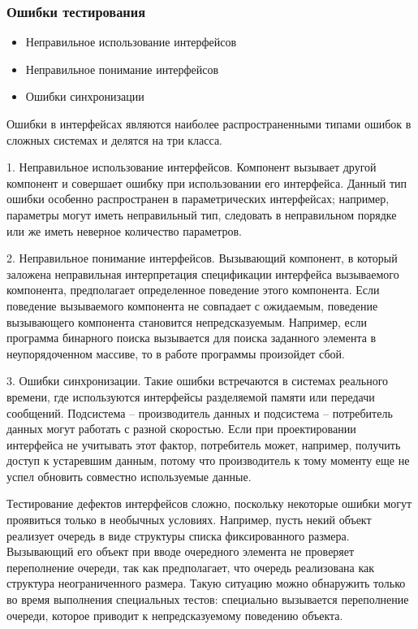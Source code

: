 \documentclass{../industrial-development}
\begin{document}
\begin{frame} \frametitle{Ошибки тестирования}
\begin{itemize}
\item Неправильное использование интерфейсов
\item Неправильное понимание интерфейсов
\item Ошибки синхронизации
\end{itemize}
\end{frame}

\lecturenotes

Ошибки в интерфейсах являются наиболее распространенными типами ошибок в сложных системах и делятся на три класса.

1. Неправильное использование интерфейсов. Компонент вызывает другой компонент и совершает ошибку при использовании его интерфейса. Данный тип ошибки особенно распространен в параметрических интерфейсах; например, параметры могут иметь неправильный тип, следовать в неправильном порядке или же иметь неверное количество параметров.

2. Неправильное понимание интерфейсов. Вызывающий компонент, в который заложена неправильная интерпретация спецификации интерфейса вызываемого компонента, предполагает определенное поведение этого компонента. Если поведение вызываемого компонента не совпадает с ожидаемым, поведение вызывающего компонента становится непредсказуемым. Например, если программа бинарного поиска вызывается для поиска заданного элемента в неупорядоченном массиве, то в работе программы произойдет сбой.

3. Ошибки синхронизации. Такие ошибки встречаются в системах реального времени, где используются интерфейсы разделяемой памяти или передачи сообщений. Подсистема – производитель данных и подсистема – потребитель данных могут работать с разной скоростью. Если при проектировании интерфейса не учитывать этот фактор, потребитель может, например, получить доступ к устаревшим данным, потому что производитель к тому моменту еще не успел обновить совместно используемые данные.

Тестирование дефектов интерфейсов сложно, поскольку некоторые ошибки могут проявиться только в необычных условиях. Например, пусть некий объект реализует очередь в виде структуры списка фиксированного размера. Вызывающий его объект при вводе очередного элемента не проверяет переполнение очереди, так как предполагает, что очередь реализована как структура неограниченного размера. Такую ситуацию можно обнаружить только во время выполнения специальных тестов: специально вызывается переполнение очереди, которое приводит к непредсказуемому поведению объекта.
\end{document}
